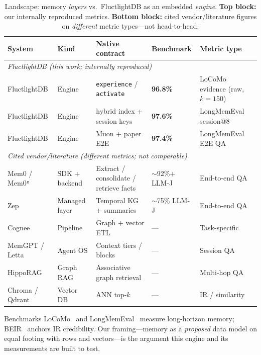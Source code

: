 \documentclass[11pt]{article}
\begin{document}
\begin{table}[h]
\centering
\caption{Landscape: memory \emph{layers} vs.\ FluctlightDB as an embedded \emph{engine}.
\textbf{Top block:} our internally reproduced metrics. \textbf{Bottom block:} cited
vendor/literature figures on \emph{different} metric types---not head-to-head.}
\label{tab:landscape}
\small
\begin{tabular}{p{2.0cm}p{1.6cm}p{2.4cm}p{2.6cm}p{2.2cm}}
\toprule
\textbf{System} & \textbf{Kind} & \textbf{Native contract} & \textbf{Benchmark} & \textbf{Metric type} \\
\midrule
\multicolumn{5}{l}{\textit{FluctlightDB (this work; internally reproduced)}} \\
\midrule
FluctlightDB & Engine & \texttt{experience} / \texttt{activate} & \textbf{96.8\%} & LoCoMo evidence (raw, $k{=}150$) \\
FluctlightDB & Engine & hybrid index + session keys & \textbf{97.6\%} & LongMemEval session@8 \\
FluctlightDB & Engine & Muon + paper E2E & \textbf{97.4\%} & LongMemEval E2E QA \\
\midrule
\multicolumn{5}{l}{\textit{Cited vendor/literature (different metrics; not comparable)}} \\
\midrule
Mem0 / Mem0$^{\text{\tiny g}}$ & SDK + backend & Extract / consolidate / retrieve facts & $\sim$92\%+ LLM-J & End-to-end QA \\
Zep & Managed layer & Temporal KG + summaries & $\sim$75\% LLM-J & End-to-end QA \\
Cognee & Pipeline & Graph + vector ETL & --- & Task-specific \\
MemGPT / Letta & Agent OS & Context tiers / blocks & --- & Session QA \\
HippoRAG & Graph RAG & Associative graph retrieval & --- & Multi-hop QA \\
Chroma / Qdrant & Vector DB & ANN top-$k$ & --- & IR / similarity \\
\bottomrule
\end{tabular}
\end{table}

Benchmarks LoCoMo~\cite{maharana2024locomo} and LongMemEval~\cite{wu2024longmemeval}
measure long-horizon memory; BEIR~\cite{thakur2021beir} anchors IR credibility.
Our framing---memory as a \emph{proposed} data model on equal footing with rows and
vectors---is the argument this engine and its measurements are built to test.
\end{document}
